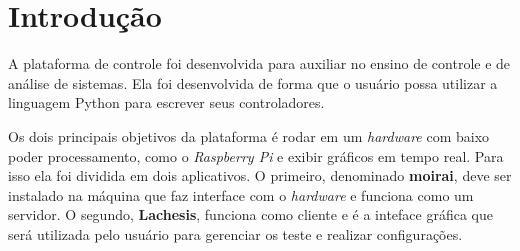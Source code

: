 
\chapter{Introdução}%
\label{chapter:introduction}

A plataforma de controle foi desenvolvida para auxiliar no ensino de controle e
de análise de sistemas. Ela foi desenvolvida de forma que o usuário possa
utilizar a linguagem Python para escrever seus controladores.

Os dois principais objetivos da plataforma é rodar em um \textit{hardware} com
baixo poder processamento, como o \textit{Raspberry Pi} e exibir gráficos em
tempo real. Para isso ela foi dividida em dois aplicativos. O primeiro, denominado
\textbf{moirai}, deve ser instalado na máquina que faz interface com o
\textit{hardware} e funciona como um servidor. O segundo, \textbf{Lachesis},
funciona como cliente e é a inteface gráfica que será utilizada pelo usuário
para gerenciar os teste e realizar configurações.

